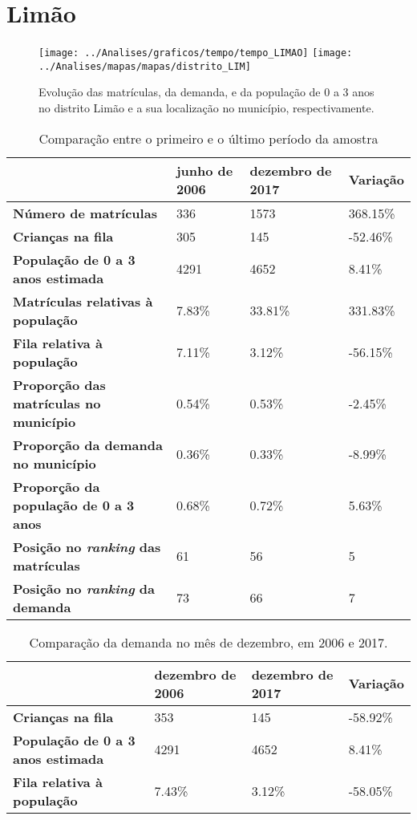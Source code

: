 \section{Limão}
\begin{figure}[H]
\centering
\texttt{[image: ../Analises/graficos/tempo/tempo\_LIMAO]}
\texttt{[image: ../Analises/mapas/mapas/distrito\_LIM]}
\caption{Evolução das matrículas, da demanda, e da população de 0 a 3 anos no distrito Limão e a sua localização no município, respectivamente.}
\end{figure}
\begin{table}[H]
\begin{tabular}{l|l|l|l}
\textbf{}                                      & \textbf{junho de 2006}       & \textbf{dezembro de 2017}    & \textbf{Variação} \\ \hline
\textbf{Número de matrículas}                  & 336 & 1573 & 368.15\% \\ \hline
\textbf{Crianças na fila}                      & 305 & 145 & -52.46\% \\ \hline
\textbf{População de 0 a 3 anos estimada}      & 4291 & 4652 & 8.41\% \\ \hline
\textbf{Matrículas relativas à população}      & 7.83\% & 33.81\% & 331.83\% \\ \hline
\textbf{Fila relativa à população}             & 7.11\% & 3.12\% & -56.15\% \\ \hline
\textbf{Proporção das matrículas no município} & 0.54\% & 0.53\% & -2.45\% \\ \hline
\textbf{Proporção da demanda no município}     & 0.36\% & 0.33\% & -8.99\% \\ \hline
\textbf{Proporção da população de 0 a 3 anos}  & 0.68\% & 0.72\% & 5.63\% \\ \hline
\textbf{Posição no \textit{ranking} das matrículas}     & 61 & 56 & 5 \\ \hline
\textbf{Posição no \textit{ranking} da demanda}         & 73 & 66 & 7 \\ 
\end{tabular}
\caption{Comparação entre o primeiro e o último período da amostra}
\end{table}
\begin{table}[H]
\begin{tabular}{l|l|l|l}
\textbf{}                                 & \textbf{dezembro de 2006} & \textbf{dezembro de 2017} & \textbf{Variação} \\ \hline
\textbf{Crianças na fila}                      & 353 & 145 & -58.92\% \\ \hline
\textbf{População de 0 a 3 anos estimada}      & 4291 & 4652 & 8.41\% \\ \hline
\textbf{Fila relativa à população}             & 7.43\% & 3.12\% & -58.05\% \\
\end{tabular}
\caption{Comparação da demanda no mês de dezembro, em 2006 e 2017.}
\end{table}
